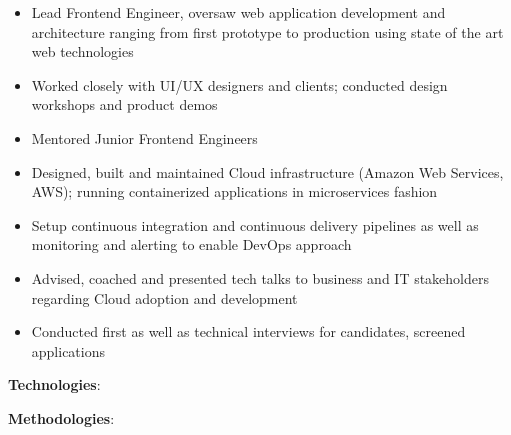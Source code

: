 \documentclass[10pt, a4paper,ragged2e]{altacv}
\begin{document}
		
\begin{fullwidth}
	\makecvheader
\end{fullwidth}	


\begin{itemize}
	\item Lead Frontend Engineer, oversaw web application development and architecture ranging from first prototype to production using state of the art web technologies
	\item Worked closely with UI/UX designers and clients; conducted design workshops and product demos
	\item Mentored Junior Frontend Engineers
	\item Designed, built and maintained Cloud infrastructure (Amazon Web Services, AWS); running containerized applications in microservices fashion
	\item Setup continuous integration and continuous delivery pipelines as well as monitoring and alerting to enable DevOps approach
	\item Advised, coached and presented tech talks to business and IT stakeholders regarding Cloud adoption and development
	\item Conducted first as well as technical interviews for candidates, screened applications
\end{itemize}

\textbf{Technologies}: 

\textbf{Methodologies}: 
\end{document}
